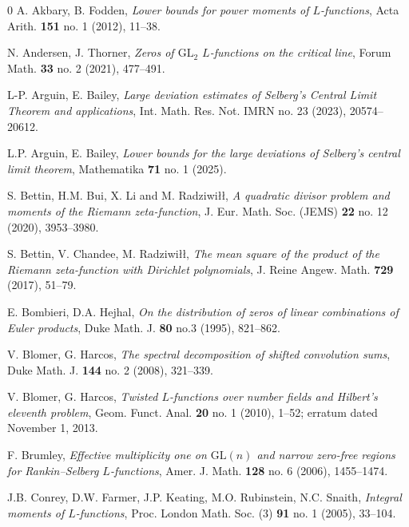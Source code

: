 \documentclass[oneside, 12pt]{amsart}
\theoremstyle{definition}
\begin{document}
	\begin{thebibliography}{0}
		 A. Akbary, B. Fodden, \emph{Lower bounds for power moments of {$L$}-functions}, Acta Arith. {\bf 151} no. 1 (2012), 11--38.
		
		 {N. Andersen, J. Thorner, \emph{Zeros of $\mathrm{GL}_2$ $L$-functions on the critical line}, Forum Math. {\bf 33} no. 2 (2021), 477--491.}
		
		 L-P. Arguin, E. Bailey, \emph{Large deviation estimates of {S}elberg's {C}entral {L}imit
			{T}heorem and applications}, Int. Math. Res. Not. IMRN no. 23 (2023), 20574--20612. 
		
		 L.P. Arguin, E. Bailey, \emph{Lower bounds for the large deviations of {S}elberg's central limit theorem}, Mathematika {\bf 71} no. 1 (2025).
		
		 S. Bettin, H.M. Bui, X. Li and M. Radziwi\l\l, \emph{A quadratic divisor problem and moments of the {R}iemann zeta-function}, J. Eur. Math. Soc. (JEMS) {\bf 22} no. 12 (2020), 3953--3980.
		
		 S. Bettin, V. Chandee, M. Radziwi\l\l, \emph{The mean square of the product of the {R}iemann zeta-function with {D}irichlet polynomials}, J. Reine Angew. Math. {\bf 729} (2017), 51--79.
		
		 E. Bombieri, D.A. Hejhal, \emph{On the distribution of zeros of linear combinations of Euler products}, Duke Math. J. {\bf 80} no.3 (1995), 821--862.
		
		 {V. Blomer, G. Harcos, \emph{The spectral decomposition of shifted convolution sums}, Duke Math. J. {\bf 144} no. 2 (2008), 321--339.}
		
		 {V. Blomer, G. Harcos, \emph{Twisted $L$-functions over number fields and Hilbert's eleventh problem}, Geom. Funct. Anal. {\bf 20} no. 1 (2010), 1--52; erratum dated November 1, 2013.}
		
		 {F. Brumley, \emph{Effective multiplicity one on $\mathrm{GL}(n)$ and narrow zero-free regions for Rankin--Selberg $L$-functions}, Amer. J. Math. {\bf 128} no. 6 (2006), 1455--1474.}
		
		 J.B. Conrey, D.W. Farmer, J.P. Keating, M.O. Rubinstein, N.C. Snaith, \emph{Integral moments of {$L$}-functions}, Proc. London Math. Soc. (3) {\bf 91} no. 1 (2005), 33--104.
		

\end{thebibliography}
\end{document}
